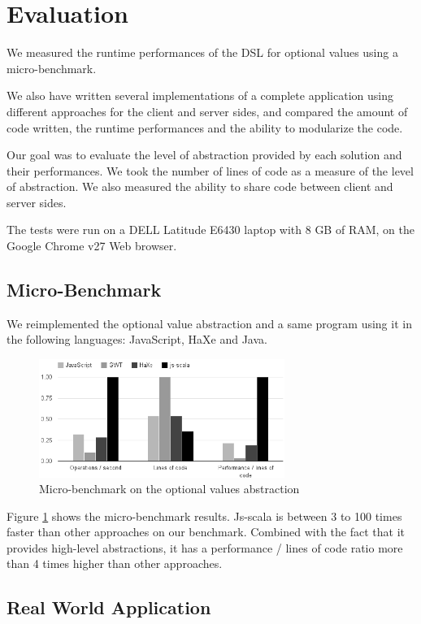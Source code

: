 \documentclass[preprint]{sigplanconf}
\begin{document}
\section{Evaluation}
\label{validation}

We measured the runtime performances of the DSL for optional values using a micro-benchmark.

We also have written several implementations of a complete application using different approaches
for the client and server sides, and compared the amount of code written, the runtime performances
and the ability to modularize the code.

Our goal was to evaluate the level of abstraction provided by each solution and their performances.
We took the number of lines of code as a measure of the level of abstraction. We also measured the
ability to share code between client and server sides.

The tests were run on a DELL Latitude E6430 laptop with 8 GB of RAM, on the Google Chrome v27 Web
browser.

\subsection{Micro-Benchmark}

We reimplemented the optional value abstraction and a same program using it in the following
languages: JavaScript, HaXe and Java.

\begin{figure}
\centering
\includegraphics[width=8cm]{microbenchmark.png}
\caption{Micro-benchmark on the optional values abstraction}
\label{micro-benchmark}
\end{figure}

Figure \ref{micro-benchmark} shows the micro-benchmark results. Js-scala is between 3 to 100 times
faster than other approaches on our benchmark. Combined with the fact that it provides high-level
abstractions, it has a performance / lines of code ratio more than 4 times higher than other
approaches.

\subsection{Real World Application}
\end{document}
